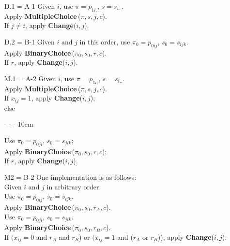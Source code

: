\documentclass[a4paper,12pt,fleqn]{article}
\makeatletter
\newenvironment{frindent}[3]
{\par \setlength{\leftmargin}{#1}       \setlength{\rightmargin}{#2}
  \advance\linewidth - \leftmargin       \advance\linewidth -\rightmargin
  \advance\linewidth - #3
  \advance\@totalleftmargin\leftmargin  \@setpar{{\@@par}}%
  \parshape 1 \@totalleftmargin         \linewidth \ignorespaces
  \begin{minipage}[h]{\linewidth}\begin{framed}}{\end{framed}\end{minipage}\par}
\makeatother
\begin{document}
\begin{itemize}
\item[D.1 = A-1] Given $i$, use $\pi = p_{1i.}$, $s = s_{i..}$.\\
                 Apply \textbf{MultipleChoice}\,($\pi,s,j,c$).\\
                 If $j \neq i$, apply \textbf{Change}($i,j$).
\item[D.2 = B-1] Given $i$ and $j$ in this order,
                 use $\pi_0 = p_{0ij}$, $s_0 = s_{ijk}$.\\
                 Apply \textbf{BinaryChoice}\,($\pi_0,s_0,r,c$).\\
                 If $r$, apply \textbf{Change}($i,j$).
\item[M.1 = A-2] Given $i$, use $\pi = p_{1i.}$, $s = s_{i..}$.\\
                 Apply \textbf{MultipleChoice}\,($\pi,s,j,c$).\\
                 If $x_{ij} = 1$, apply \textbf{Change}($i,j$);\\
                 else
                 \begin{frindent}{2em}{1em}{10em}
                 Use $\pi_0 = p_{0ji}$, $s_0 = s_{jik}$;\\
                 Apply \textbf{BinaryChoice}\,($\pi_0,s_0,r,c$);\\
                 If $r$, apply \textbf{Change}($i,j$).
                 \end{frindent}
\item[M2 = B-2]  One implementation is as follows:\\
                  Given $i$ and $j$ in arbitrary order:\\
                 Use $\pi_0 = p_{0ij}$, $s_0 = s_{ijk}$.\\
                 Apply \textbf{BinaryChoice}\,($\pi_0,s_0,r_A,c$).\\
                 Use $\pi_0 = p_{0ji}$, $s_0 = s_{jik}$.\\
                 Apply \textbf{BinaryChoice}\,($\pi_0,s_0,r_B,c$).\\
                 If $(x_{ij} = 0$ and $r_A$ and $r_B$)
                 or $(x_{ij} = 1$ and \big($r_A$ or $r_B$)\big), apply \textbf{Change}($i,j$).


\end{itemize}
\end{document}
